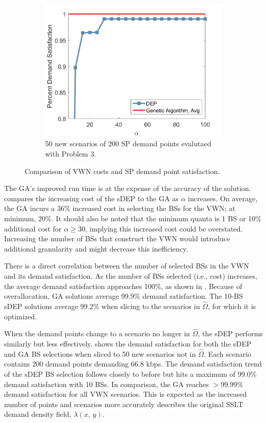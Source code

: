 \documentclass[conference]{IEEEtran}
\begin{document}
\begin{figure}[t]
\begin{subfigure}{.3\textwidth}
	\centering
	\includegraphics[width=1\linewidth]{Figures/ComparisonSatisfactionEval}
	\caption{50 new scenarios of 200 SP demand points evalutaed with Problem 3.}
	\label{fig:VWNCompSatisEval}
\end{subfigure}
\caption{\small Comparison of VWN costs and SP demand point satisfaction.}
\label{fig:VWNComp}
\end{figure}

The GA's improved run time is at the expense of the accuracy of the solution.   compares the increasing cost of the sDEP to the GA as $\alpha$ increases.  On average, the GA incurs a 36\% increased cost in selecting the BSs for the VWN; at minimum, 20\%.  It should also be noted that the minimum quanta is 1 BS or 10\% additional cost for $\alpha \geq 30$, implying this increased cost could be overstated.  Increasing the number of BSs that construct the VWN would introduce additional granularity and might decrease this inefficiency.

There is a direct correlation between the number of selected BSs in the VWN and its demand satisfaction.  As the number of BSs selected (i.e., cost) increases, the average demand satisfaction approaches 100\%, as shown in .  Because of overallocation, GA solutions average 99.9\% demand satisfaction.  The 10-BS sDEP solutions average 99.2\% when slicing to the scenarios in $\hat{\Omega}$, for which it is optimized.

When the demand points change to a scenario no longer in $\hat{\Omega}$, the sDEP performs similarly but less effectively.   shows the demand satisfaction for both the sDEP and GA BS selections when sliced to 50 new scenarios not in $\hat{\Omega}$.  Each scenario contains 200 demand points demanding 66.8 kbps.  The demand satisfaction trend of the sDEP BS selection follows closely to before but hits a maximum of 99.0\% demand satisfaction with 10 BSs.  In comparison, the GA reaches $> 99.99\%$ demand satisfaction for all VWN scenarios.  This is expected as the increased number of points and scenarios more accurately describes the original SSLT demand density field, $\lambda\left( x,\, y \right)$.
\end{document}
